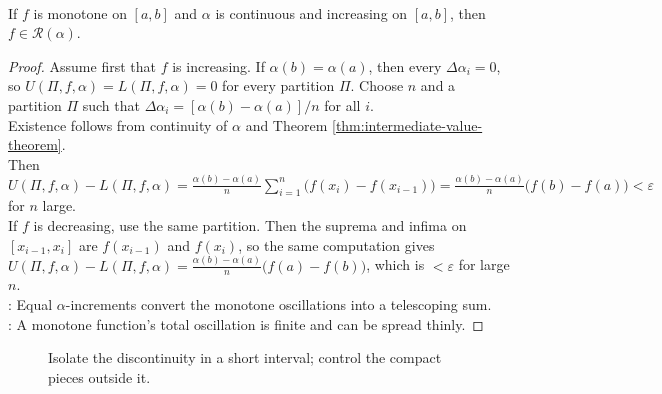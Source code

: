 \begin{theorem} \label{thm:monotone-functions-integrable-continuous-integrator} \\
If $f$ is monotone on $[a,b]$ and $\alpha$ is continuous and increasing on $[a,b]$, then $f\in\mathcal{R}(\alpha)$.
\begin{proof}
Assume first that $f$ is increasing. If $\alpha(b)=\alpha(a)$, then every $\Delta\alpha_i=0$, so $U(\Pi,f,\alpha)=L(\Pi,f,\alpha)=0$ for every partition $\Pi$. Choose $n$ and a partition $\Pi$ such that $\Delta\alpha_i=[\alpha(b)-\alpha(a)]/n$ for all $i$.\\
Existence follows from continuity of $\alpha$ and Theorem \ref{thm:intermediate-value-theorem}.\\
Then $U(\Pi,f,\alpha)-L(\Pi,f,\alpha) =\frac{\alpha(b)-\alpha(a)}{n}\sum\limits_{i=1}^{n}\bigl(f(x_i)-f(x_{i-1})\bigr) =\frac{\alpha(b)-\alpha(a)}{n}\bigl(f(b)-f(a)\bigr) <\varepsilon$ for $n$ large.\\
If $f$ is decreasing, use the same partition. Then the suprema and infima on $[x_{i-1},x_i]$ are $f(x_{i-1})$ and $f(x_i)$, so the same computation gives $U(\Pi,f,\alpha)-L(\Pi,f,\alpha)=\frac{\alpha(b)-\alpha(a)}{n}\bigl(f(a)-f(b)\bigr)$, which is $<\varepsilon$ for large $n$.\\
: Equal $\alpha$-increments convert the monotone oscillations into a telescoping sum.\\
: A monotone function's total oscillation is finite and can be spread thinly.
\end{proof}
\end{theorem}

\begin{figure}[H]
  \centering
  
  \caption{Isolate the discontinuity in a short interval; control the compact pieces outside it.}
  \label{fig:discontinuity-isolation-partition}
\end{figure}

